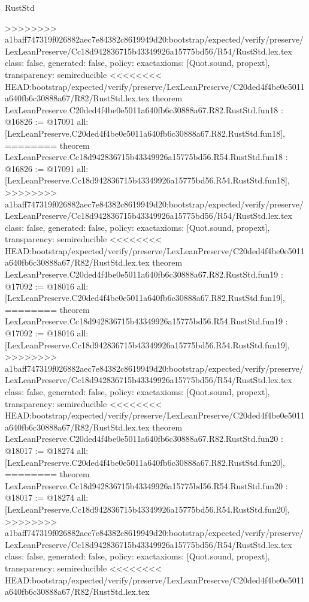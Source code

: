 \begin{lexlean}{RustStd}
\begin{coremodule}
{\begin{coremodule}
{{{{{{{{{{{{{{{{{{{{{>>>>>>>> a1baff747319f026882aec7e84382c8619949d20:bootstrap/expected/verify/preserve/LexLeanPreserve/Cc18d942836715b43349926a15775bd56/R54/RustStd.lex.tex
  class: false,
  generated: false,
  policy: exact{axioms: [Quot.sound, propext]},
  transparency: semireducible
}
<<<<<<<< HEAD:bootstrap/expected/verify/preserve/LexLeanPreserve/C20ded4f4be0e5011a640fb6c30888a67/R82/RustStd.lex.tex
theorem LexLeanPreserve.C20ded4f4be0e5011a640fb6c30888a67.R82.RustStd.fun18 : @16826 := @17091 {
  all: [LexLeanPreserve.C20ded4f4be0e5011a640fb6c30888a67.R82.RustStd.fun18],
========
theorem LexLeanPreserve.Cc18d942836715b43349926a15775bd56.R54.RustStd.fun18 : @16826 := @17091 {
  all: [LexLeanPreserve.Cc18d942836715b43349926a15775bd56.R54.RustStd.fun18],
>>>>>>>> a1baff747319f026882aec7e84382c8619949d20:bootstrap/expected/verify/preserve/LexLeanPreserve/Cc18d942836715b43349926a15775bd56/R54/RustStd.lex.tex
  class: false,
  generated: false,
  policy: exact{axioms: [Quot.sound, propext]},
  transparency: semireducible
}
<<<<<<<< HEAD:bootstrap/expected/verify/preserve/LexLeanPreserve/C20ded4f4be0e5011a640fb6c30888a67/R82/RustStd.lex.tex
theorem LexLeanPreserve.C20ded4f4be0e5011a640fb6c30888a67.R82.RustStd.fun19 : @17092 := @18016 {
  all: [LexLeanPreserve.C20ded4f4be0e5011a640fb6c30888a67.R82.RustStd.fun19],
========
theorem LexLeanPreserve.Cc18d942836715b43349926a15775bd56.R54.RustStd.fun19 : @17092 := @18016 {
  all: [LexLeanPreserve.Cc18d942836715b43349926a15775bd56.R54.RustStd.fun19],
>>>>>>>> a1baff747319f026882aec7e84382c8619949d20:bootstrap/expected/verify/preserve/LexLeanPreserve/Cc18d942836715b43349926a15775bd56/R54/RustStd.lex.tex
  class: false,
  generated: false,
  policy: exact{axioms: [Quot.sound, propext]},
  transparency: semireducible
}
<<<<<<<< HEAD:bootstrap/expected/verify/preserve/LexLeanPreserve/C20ded4f4be0e5011a640fb6c30888a67/R82/RustStd.lex.tex
theorem LexLeanPreserve.C20ded4f4be0e5011a640fb6c30888a67.R82.RustStd.fun20 : @18017 := @18274 {
  all: [LexLeanPreserve.C20ded4f4be0e5011a640fb6c30888a67.R82.RustStd.fun20],
========
theorem LexLeanPreserve.Cc18d942836715b43349926a15775bd56.R54.RustStd.fun20 : @18017 := @18274 {
  all: [LexLeanPreserve.Cc18d942836715b43349926a15775bd56.R54.RustStd.fun20],
>>>>>>>> a1baff747319f026882aec7e84382c8619949d20:bootstrap/expected/verify/preserve/LexLeanPreserve/Cc18d942836715b43349926a15775bd56/R54/RustStd.lex.tex
  class: false,
  generated: false,
  policy: exact{axioms: [Quot.sound, propext]},
  transparency: semireducible
}
<<<<<<<< HEAD:bootstrap/expected/verify/preserve/LexLeanPreserve/C20ded4f4be0e5011a640fb6c30888a67/R82/RustStd.lex.tex
}}}}}}}}}}}}}}}}}}}}}}}
\end{coremodule}}
\end{coremodule}
\end{lexlean}
